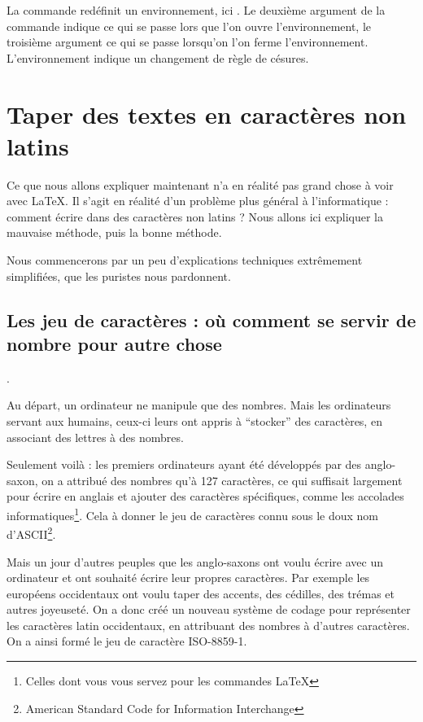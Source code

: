 \begin{anedocte}
La commande  redéfinit un environnement, ici . Le deuxième argument de la commande indique ce qui se passe lors que l'on ouvre l'environnement, le troisième argument ce qui se passe lorsqu'on l'on ferme l'environnement. L'environnement  indique un changement de règle de césures.
\end{anedocte}


\section{Taper des textes en caractères non latins}\label{utf8}

Ce que nous allons expliquer maintenant n'a en réalité pas grand chose à voir avec \LaTeX. Il s'agit en réalité d'un problème plus général à l'informatique : comment écrire dans des caractères non latins ? Nous allons ici expliquer la mauvaise méthode, puis la bonne méthode.

Nous commencerons par un peu d'explications techniques extrêmement simplifiées, que les puristes nous pardonnent.

\subsection{Les jeu de caractères : où comment se servir de nombre pour autre chose}.

Au départ, un ordinateur ne manipule que des nombres. Mais les ordinateurs servant aux humains, ceux-ci leurs ont appris à \enquote{stocker} des caractères, en associant des lettres à des nombres.

Seulement voilà : les premiers ordinateurs ayant été développés par des anglo-saxon, on a  attribué des nombres qu'à  127 caractères, ce qui suffisait largement pour écrire en anglais et ajouter des caractères spécifiques, comme les accolades informatiques\footnote{Celles dont vous vous servez pour les commandes \LaTeX}. Cela à donner le jeu de caractères connu sous le doux nom d'ASCII\footnote{\textenglish{American Standard Code for Information Interchange}}.

Mais un jour d'autres peuples que les anglo-saxons ont voulu écrire avec un ordinateur et ont souhaité écrire leur propres caractères. Par exemple les européens occidentaux ont voulu taper des accents, des cédilles, des trémas et autres joyeuseté. On a donc créé un nouveau système de codage pour représenter les caractères latin occidentaux, en attribuant des nombres à d'autres caractères. On a ainsi formé le jeu de caractère  ISO-8859-1. 

